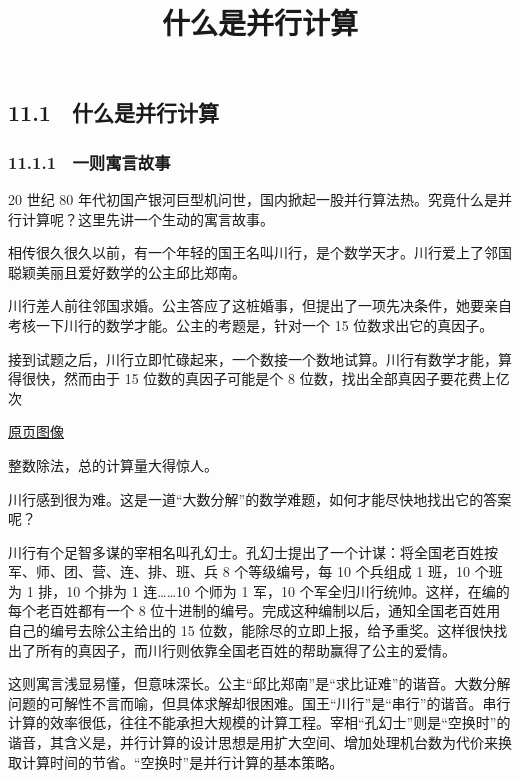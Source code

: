 \documentclass[
  10pt,
  fontset=fandol]{ctexart}
\title{什么是并行计算}
\author{}
\date{}
\begin{document}
\maketitle

\subsection{11.1　什么是并行计算}\label{ux4ec0ux4e48ux662fux5e76ux884cux8ba1ux7b97}

\subsubsection{11.1.1　一则寓言故事}\label{ux4e00ux5219ux5bd3ux8a00ux6545ux4e8b}

20 世纪 80 年代初国产银河巨型机问世，国内掀起一股并行算法热。究竟什么是并行计算呢？这里先讲一个生动的寓言故事。

相传很久很久以前，有一个年轻的国王名叫川行，是个数学天才。川行爱上了邻国聪颖美丽且爱好数学的公主邱比郑南。

川行差人前往邻国求婚。公主答应了这桩婚事，但提出了一项先决条件，她要亲自考核一下川行的数学才能。公主的考题是，针对一个 15 位数求出它的真因子。

接到试题之后，川行立即忙碌起来，一个数接一个数地试算。川行有数学才能，算得很快，然而由于 15 位数的真因子可能是个 8 位数，找出全部真因子要花费上亿次

\href{../../source-images/pdf-277.jpeg}{原页图像}

整数除法，总的计算量大得惊人。

川行感到很为难。这是一道``大数分解''的数学难题，如何才能尽快地找出它的答案呢？

川行有个足智多谋的宰相名叫孔幻士。孔幻士提出了一个计谋：将全国老百姓按军、师、团、营、连、排、班、兵 8 个等级编号，每 10 个兵组成 1 班，10 个班为 1 排，10 个排为 1 连\ldots\ldots10 个师为 1 军，10 个军全归川行统帅。这样，在编的每个老百姓都有一个 8 位十进制的编号。完成这种编制以后，通知全国老百姓用自己的编号去除公主给出的 15 位数，能除尽的立即上报，给予重奖。这样很快找出了所有的真因子，而川行则依靠全国老百姓的帮助赢得了公主的爱情。

这则寓言浅显易懂，但意味深长。公主``邱比郑南''是``求比证难''的谐音。大数分解问题的可解性不言而喻，但具体求解却很困难。国王``川行''是``串行''的谐音。串行计算的效率很低，往往不能承担大规模的计算工程。宰相``孔幻士''则是``空换时''的谐音，其含义是，并行计算的设计思想是用扩大空间、增加处理机台数为代价来换取计算时间的节省。``空换时''是并行计算的基本策略。
\end{document}
